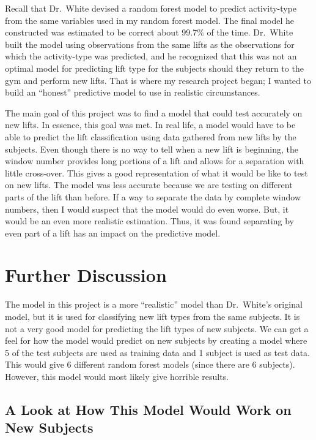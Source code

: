 \documentclass[12pt,twoside]{reedthesis}
\begin{document}
  Recall that Dr.~White devised a random forest model to predict
  activity-type from the same variables used in my random forest model.
  The final model he constructed was estimated to be correct about 99.7\%
  of the time. Dr.~White built the model using observations from the same
  lifts as the observations for which the activity-type was predicted, and
  he recognized that this was not an optimal model for predicting lift
  type for the subjects should they return to the gym and perform new
  lifts. That is where my research project began; I wanted to build an
  ``honest'' predictive model to use in realistic circumstances.
  
  The main goal of this project was to find a model that could test
  accurately on new lifts. In essence, this goal was met. In real life, a
  model would have to be able to predict the lift classification using
  data gathered from new lifts by the subjects. Even though there is no
  way to tell when a new lift is beginning, the window number provides
  long portions of a lift and allows for a separation with little
  cross-over. This gives a good representation of what it would be like to
  test on new lifts. The model was less accurate because we are testing on
  different parts of the lift than before. If a way to separate the data
  by complete window numbers, then I would suspect that the model would do
  even worse. But, it would be an even more realistic estimation. Thus, it
  was found separating by even part of a lift has an impact on the
  predictive model.
  
  \section{Further Discussion}\label{further-discussion}
  
  The model in this project is a more ``realistic'' model than Dr.~White's
  original model, but it is used for classifying new lift types from the
  same subjects. It is not a very good model for predicting the lift types
  of new subjects. We can get a feel for how the model would predict on
  new subjects by creating a model where 5 of the test subjects are used
  as training data and 1 subject is used as test data. This would give 6
  different random forest models (since there are 6 subjects). However,
  this model would most likely give horrible results.
  
  \subsection{A Look at How This Model Would Work on New
  Subjects}\label{a-look-at-how-this-model-would-work-on-new-subjects}
  
\end{document}
